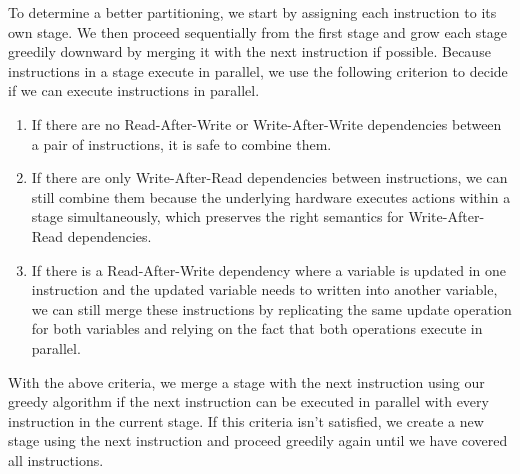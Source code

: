 To determine a better partitioning, we start by assigning each instruction to
its own stage. We then proceed sequentially from the first stage and grow each
stage greedily downward by merging it with the next instruction if possible.
Because instructions in a stage execute in parallel, we use the following
criterion to decide if we can execute instructions in parallel.
\begin{enumerate}
\item If there are no Read-After-Write or Write-After-Write dependencies
between a pair of instructions, it is safe to combine them.
\item If there are only Write-After-Read dependencies between instructions, we
can still combine them because the underlying hardware executes actions within
a stage simultaneously, which preserves the right semantics for
Write-After-Read dependencies.

\item If there is a Read-After-Write dependency where a variable is updated in
one instruction and the updated variable needs to written into another
variable, we can still merge these instructions by replicating the same update
operation for both variables and relying on the fact that both operations
execute in parallel.
\end{enumerate}
With the above criteria, we merge a stage with the next instruction using our
greedy algorithm if the next instruction can be executed in parallel with every
instruction in the current stage. If this criteria isn't satisfied, we create a
new stage using the next instruction and proceed greedily again until we have
covered all instructions.

